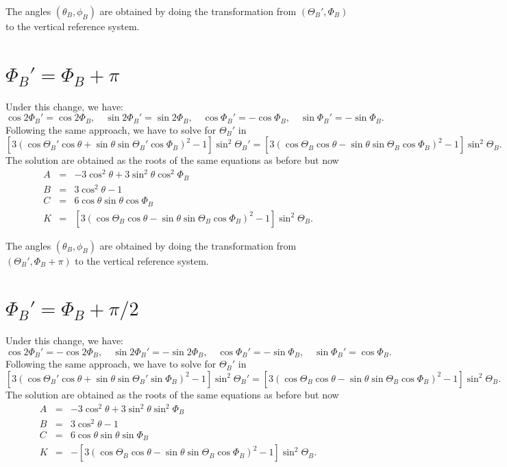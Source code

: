 \documentclass[12pt]{article}
\begin{document}
The angles $(\theta_B,\phi_B)$ are obtained by doing the transformation from $(\Theta_B',\Phi_B)$ to the
vertical reference system.

\section{$\Phi_B' = \Phi_B+\pi$}
Under this change, we have:
\begin{equation}
\cos 2\Phi_B' = \cos 2\Phi_B, \quad \sin 2\Phi_B' = \sin 2\Phi_B, \quad \cos \Phi_B' = -\cos \Phi_B, \quad \sin \Phi_B' = -\sin \Phi_B.
\end{equation}
Following the same approach, we have to solve for $\Theta_B'$ in 
\begin{equation}
\left[ 3 \left( \cos \Theta_B' \cos \theta + \sin\theta \sin\Theta_B' \cos\Phi_B\right)^2-1 \right] \sin^2 \Theta_B' = 
\left[ 3 \left( \cos \Theta_B \cos \theta - \sin\theta \sin\Theta_B \cos\Phi_B\right)^2-1 \right] \sin^2 \Theta_B.
\end{equation}
The solution are obtained as the roots of the same equations as before but now
\begin{eqnarray}
A &=& -3\cos^2 \theta + 3\sin^2 \theta \cos^2 \Phi_B \nonumber \\
B &=& 3\cos^2 \theta - 1 \nonumber \\
C &=& 6 \cos\theta \sin\theta \cos \Phi_B \nonumber \\
K &=& \left[ 3 \left( \cos \Theta_B \cos \theta - \sin\theta \sin\Theta_B \cos\Phi_B\right)^2-1 \right] \sin^2 \Theta_B.
\end{eqnarray}

The angles $(\theta_B,\phi_B)$ are obtained by doing the transformation from $(\Theta_B',\Phi_B+\pi)$ to the
vertical reference system.

\section{$\Phi_B' = \Phi_B+\pi/2$}
Under this change, we have:
\begin{equation}
\cos 2\Phi_B' = -\cos 2\Phi_B, \quad \sin 2\Phi_B' = -\sin 2\Phi_B, \quad \cos \Phi_B' = -\sin \Phi_B, \quad \sin \Phi_B' = \cos \Phi_B.
\end{equation}
Following the same approach, we have to solve for $\Theta_B'$ in 
\begin{equation}
\left[ 3 \left( \cos \Theta_B' \cos \theta + \sin\theta \sin\Theta_B' \sin\Phi_B\right)^2-1 \right] \sin^2 \Theta_B' = 
\left[ 3 \left( \cos \Theta_B \cos \theta - \sin\theta \sin\Theta_B \cos\Phi_B\right)^2-1 \right] \sin^2 \Theta_B.
\end{equation}
The solution are obtained as the roots of the same equations as before but now
\begin{eqnarray}
A &=& -3\cos^2 \theta + 3\sin^2 \theta \sin^2 \Phi_B \nonumber \\
B &=& 3\cos^2 \theta - 1 \nonumber \\
C &=& 6 \cos\theta \sin\theta \sin \Phi_B \nonumber \\
K &=& -\left[ 3 \left( \cos \Theta_B \cos \theta - \sin\theta \sin\Theta_B \cos\Phi_B\right)^2-1 \right] \sin^2 \Theta_B.
\end{eqnarray}
\end{document}
